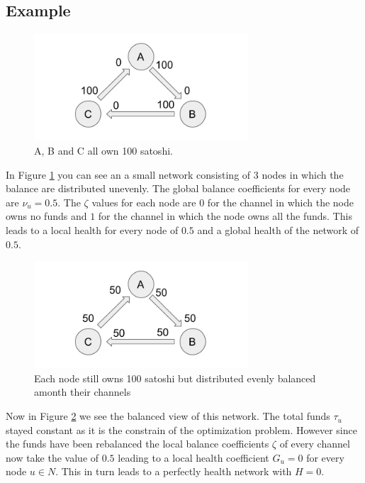 \documentclass[a4paper]{paper}
\begin{document}
\subsection{Example}\label{sec:example}
\begin{figure}
 \centering
 \includegraphics[width=8cm]{img/evenUnbalanced.png}
 \caption{A, B and C all own 100 satoshi.}
 \label{fig:evenUnbalanced}
\end{figure}
In Figure \ref{fig:evenUnbalanced} you can see an a small network consisting of $3$ nodes in which the balance are distributed unevenly.
The global balance coefficients for every node are $\nu_u=0.5$.
The $\zeta$ values for each node are $0$ for the channel in which the node owns no funds and $1$ for the channel in which the node owns all the funds.
This leads to a local health for every node of $0.5$ and a global health of the network of $0.5$.
\begin{figure}
 \centering
 \includegraphics[width=8cm]{img/evenBalanced.png}
 \caption{Each node still owns 100 satoshi but distributed evenly balanced amonth their channels}
 \label{fig:evenBalanced}
\end{figure}
Now in Figure \ref{fig:evenBalanced} we see the balanced view of this network.
The total funds $\tau_u$ stayed constant as it is the constrain of the optimization problem.
However since the funds have been rebalanced the local balance coefficients $\zeta$ of every channel now take the value of $0.5$ leading to a local health coefficient $G_u=0$ for every node $u\in N$.
This in turn leads to a perfectly health network with $H=0$.
\end{document}
